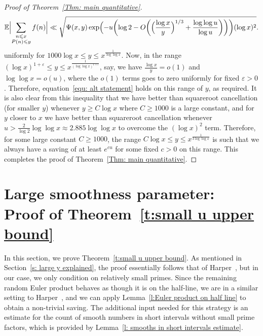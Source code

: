 \documentclass[12pt,a4paper,reqno]{amsart}
\numberwithin{equation}{section}
\def\E{\mathbb E}
\def\leq {\leqslant}
\theoremstyle{remark}
\theoremstyle{definition}
\numberwithin{equation}{section}
\theoremstyle{remark}
\def\E{\mathbb E}
\begin{document}
\begin{proof}[Proof of Theorem~\ref{Thm: main quantitative}]
\begin{equation}
\E \Bigl| \sum_{\substack{n \leq x \\ P(n) \leq y}} f(n) \Bigr| \ll \\ 
\sqrt{\Psi(x,y)\exp \Bigl(-u \biggl( \log 2 -  O \biggl(\Bigl( \frac{\log x}{y} \Bigr)^{1/3} + \frac{\log \log u}{\log u} \biggr) \biggr) \biggr) (\log x)^2}.
\end{equation}
uniformly for $1000 \log x \leq y \leq x^{\frac{1}{\log \log x}}$. Now, in the range $(\log x)^{1 + \varepsilon} \leq y \leq x^{\frac{1}{(\log \log x)^{1 + \varepsilon}}}$, say, we have $\frac{\log x}{y} = o(1)$ and $\log \log x = o(u)$, where the $o(1)$ terms goes to zero uniformly for fixed $\varepsilon > 0$. Therefore, equation~\eqref{equ: alt statement} holds on this range of $y$, as required. It is also clear from this inequality that we have better than squareroot cancellation (for smaller $y$) whenever $y \geq C \log x$ where $C \geq 1000$ is a large constant, and for $y$ closer to $x$ we have better than squareroot cancellation whenever $u > \frac{2}{\log 2} \log \log x \approx 2.885 \log \log x$ to overcome the $(\log x)^{2}$ term. Therefore, for some large constant $C \geq 1000$, the range $C \log x \leq y \leq x^{\frac{1}{3\log \log x}}$ is such that we always have a saving of at least $e^{cu}$ for some fixed $c > 0$ on this range. This completes the proof of Theorem~\ref{Thm: main quantitative}.
\end{proof}


\section{Large smoothness parameter: Proof of Theorem~\ref{t:small u upper bound}}\label{Sec: GMC}

In this section, we prove Theorem~\ref{t:small u upper bound}. As mentioned in Section~\ref{s: large y explained}, the proof essentially follows that of Harper~\cite{HarperLow}, but in our case, we only condition on relatively small primes. Since the remaining random Euler product behaves as though it is on the half-line, we are in a similar setting to Harper~\cite{HarperLow}, and we can apply Lemma~\ref{l:Euler product on half line} to obtain a non-trivial saving. The additional input needed for this strategy is an estimate for the count of smooth numbers in short intervals without small prime factors, which is provided by Lemma~\ref{l: smooths in short intervals estimate}.
\end{document}
